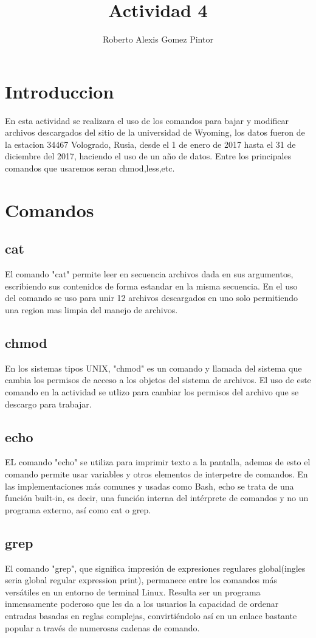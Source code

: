 \documentclass{article}
\title{Actividad 4}
\author{Roberto Alexis Gomez Pintor}
\begin{document}
\maketitle
\section{Introduccion}
En esta actividad se realizara el uso de los comandos para bajar y modificar archivos descargados del sitio de la universidad de Wyoming, los datos fueron de la estacion 34467 Vologrado, Rusia, desde el 1 de enero de 2017 hasta el 31 de diciembre del 2017, haciendo el uso de un año de datos. Entre los principales comandos que usaremos seran chmod,less,etc.

\section{Comandos}
\subsection{cat}
El comando "cat" permite leer en secuencia archivos dada en sus argumentos, escribiendo sus contenidos de forma estandar en la misma secuencia. En el uso del comando se uso para unir 12 archivos descargados en uno solo permitiendo una region mas limpia del manejo de archivos.
\subsection{chmod}
En los sistemas tipos UNIX, "chmod" es un comando y llamada del sistema que cambia los permisos de acceso a los objetos del sistema de archivos. El uso de este comando en la actividad se utlizo para cambiar los permisos del archivo que se descargo para trabajar.
\subsection{echo}
EL comando "echo" se utiliza para imprimir texto a la pantalla, ademas de esto el comando permite usar variables y otros elementos de interpetre de comandos. En las implementaciones más comunes y usadas como Bash, echo se trata de una función built-in, es decir, una función interna del intérprete de comandos y no un programa externo, así como cat o grep.
\subsection{grep}
El comando "grep", que significa impresión de expresiones regulares global(ingles seria global regular expression print), permanece entre los comandos más versátiles en un entorno de terminal Linux. Resulta ser un programa inmensamente poderoso que les da a los usuarios la capacidad de ordenar entradas basadas en reglas complejas, convirtiéndolo así en un enlace bastante popular a través de numerosas cadenas de comando.
\end{document}
